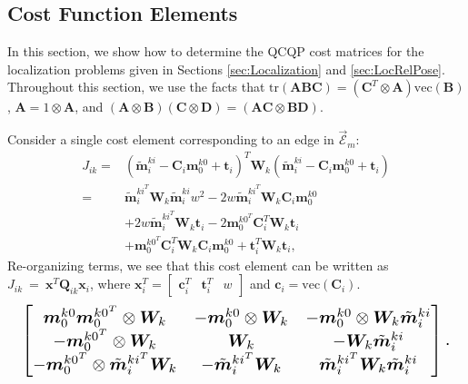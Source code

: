 \documentclass[lettersize,journal]{IEEEtran}
\newcommand{\EdgeSet}{\vec{\bm{\mathcal{E}}}}
\newcommand{\vect}[1]{\mbox{vec}(#1)}
\newcommand{\tr}[1]{\mbox{tr}\left(#1\right)}
\begin{document}
\subsection{Cost Function Elements}\label{SM:LocCost}

In this section, we show how to determine the QCQP cost matrices for the localization problems given in Sections \ref{sec:Localization} and \ref{sec:LocRelPose}. Throughout this section, we use the facts that $ \tr{\bm{A}\bm{B}\bm{C}} = (\bm{C}^T\otimes\bm{A}) \vect{\bm{B}}$, $ \bm{A} = 1\otimes\bm{A} $, and $ (\bm{A}\otimes\bm{B})(\bm{C}\otimes\bm{D}) = (\bm{AC}\otimes\bm{BD}) $\cite{magnusMatrixDifferentialCalculus2019}. 

Consider a single cost element corresponding to an edge in $\EdgeSet_m $:
\begin{align*}
	J_{ik}=&(\tilde{\bm{m}}_i^{ki} - \bm{C}_i\bm{m}_0^{k0} + \bm{t}_i)^T \bm{W}_k (\tilde{\bm{m}}_i^{ki} - \bm{C}_i\bm{m}_0^{k0} + \bm{t}_i) \\
	=& \tilde{\bm{m}}_i^{ki^T}\bm{W}_k\tilde{\bm{m}}_i^{ki} w^2 - 2 w\tilde{\bm{m}}_i^{ki^T}\bm{W}_k\bm{C}_i\bm{m}_0^{k0}  \\
	&+ 2 w\tilde{\bm{m}}_i^{ki^T}\bm{W}_k\bm{t}_i -2\bm{m}_0^{k0^T}\bm{C}_i^T\bm{W}_k\bm{t}_i\\
	& + \bm{m}_0^{k0^T}\bm{C}_i^T\bm{W}_k\bm{C}_i\bm{m}_0^{k0} + \bm{t}_i^T\bm{W}_k\bm{t}_i,
\end{align*}
Re-organizing terms, we see that this cost element can be written as $J_{ik}~=~\bm{x}^T\bm{Q}_{ik}\bm{x}_i$, where $ \bm{x}_i^T = \begin{bmatrix} \bm{c}_i^T &  \bm{t}_i^T & w \end{bmatrix} $ and $ \bm{c}_i=\vect{\bm{C}_i} $.
\begin{equation*}
	\resizebox{0.98\columnwidth}{!}{$\begin{bmatrix}
			\bm{m}_0^{k0}\bm{m}_0^{k0^T} \otimes \bm{W}_k  & -\bm{m}_0^{k0}\otimes\bm{W}_k & -\bm{m}_0^{k0}\otimes\bm{W}_k\tilde{\bm{m}}_i^{ki}\\
			 -\bm{m}_0^{k0^T}\otimes\bm{W}_k & \bm{W}_k & -\bm{W}_k\tilde{\bm{m}}_i^{ki} \\
			-\bm{m}_0^{k0^T}\otimes\tilde{\bm{m}}_i^{ki^T}\bm{W}_k & -\tilde{\bm{m}}_i^{ki^T}\bm{W}_k & \tilde{\bm{m}}_i^{ki^T}\bm{W}_k\tilde{\bm{m}}_i^{ki}
		\end{bmatrix}.$}
\end{equation*}
\end{document}
